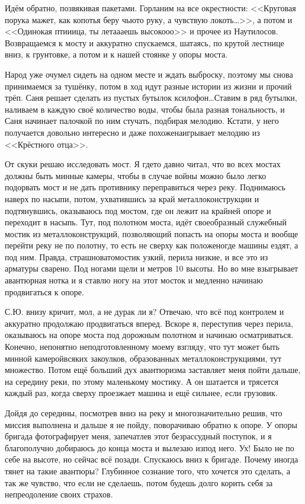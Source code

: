 Идём обратно, позвякивая пакетами. Горланим на все окрестности: <<Круговая порука мажет, как копоть\mdash я беру чью\sdash то руку, а чувствую локоть\ldots>>, а потом и <<Одинокая пти\sdash и\sdash ица, ты лета\sdash а\sdash аешь высоко\sdash о\sdash о>> и прочее из Наутилосов. Возвращаемся к мосту и аккуратно спускаемся, шатаясь, по крутой лестнице вниз, к грунтовке, а потом и к нашей стоянке у опоры моста. 

Народ уже очумел сидеть на одном месте и ждать выброску, поэтому мы снова принимаемся за тушёнку, потом в ход идут разные истории из жизни и прочий трёп. Саня решает сделать из пустых бутылок ксилофон\ldots Ставим в ряд бутылки, наливаем в каждую своё количество воды, чтобы была разная тональность, и Саня начинает палочкой по ним стучать, подбирая мелодию. Кстати, у него получается довольно интересно и даже похоже\mdash наигрывает мелодию из <<Крёстного отца>>. 

От скуки решаю исследовать мост. Я где\sdash то давно читал, что во всех мостах должны быть минные камеры, чтобы в случае войны можно было легко подорвать мост и не дать противнику переправиться через реку. Поднимаюсь наверх по насыпи, потом, ухватившись за край металлоконструкции и подтянувшись, оказываюсь под мостом, где он лежит на крайней опоре и переходит в насыпь. Тут, под полотном моста, идёт своеобразный служебный мостик из металлоконструкций, позволяющий попасть на опоры моста и вообще перейти реку не по полотну, то есть не сверху как положено\mdash где машины ездят, а под ним. Правда, страшновато\mdash мостик узкий, перила низкие, и все это из арматуры сварено. Под ногами щели и метров 10 высоты. Но во мне взыгрывает авантюрная нотка и я ставлю ногу на этот мосток и медленно начинаю продвигаться к опоре. 

С.Ю. внизу кричит, мол, а не дурак ли я? Отвечаю, что всё под контролем и аккуратно продолжаю продвигаться вперед. Вскоре я, переступив через перила, оказываюсь на опоре моста под дорожным полотном и начинаю осматриваться. Конечно, непонятно неподготовленному моему взгляду, что тут может быть минной камерой\mdash всяких закоулков, образованных металлоконструкциями, тут множество. Потом ещё больший дух авантюризма заставляет меня пойти дальше, на середину реки, по этому маленькому мостику. А он шатается и трясется каждый раз, когда сверху проезжает машина и ещё сильнее, если грузовик. 

Дойдя до середины, посмотрев вниз на реку и многозначительно решив, что миссия выполнена и дальше я не пойду, поворачиваю обратно к опоре. У опоры бригада фотографирует меня, запечатлев этот безрассудный поступок, и я благополучно добираюсь до конца моста и вылезаю из\sdash под него. Ух! Было не по себе на высоте, но сейчас всё позади. Спускаюсь вниз к бригаде. Почему иногда тянет на такие авантюры? Глубинное сознание того, что хочется это сделать, а так же чувство, что если не сделаешь, потом будешь долго корить себя за непреодоление своих страхов.

